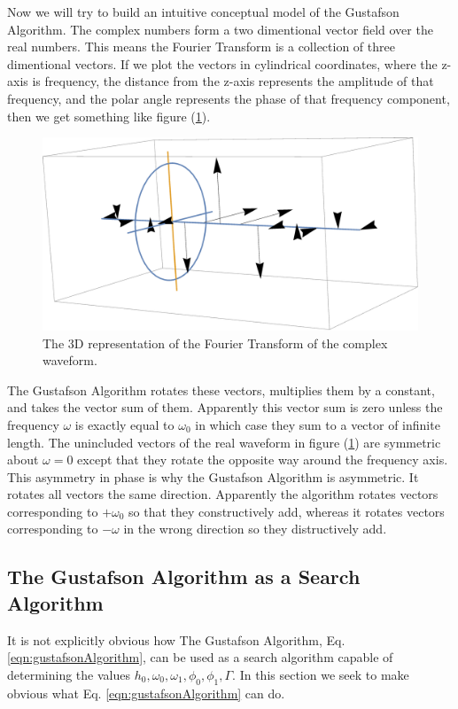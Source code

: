 \documentclass[onecolumn, groupedaddress, 10pt]{revtex4-1}
\begin{document}
Now we will try to build an intuitive conceptual model of the Gustafson Algorithm.  The complex numbers form a two dimentional vector field over the real numbers.  This means the Fourier Transform is a collection of three dimentional vectors.  If we plot the vectors in cylindrical coordinates, where the z-axis is frequency, the distance from the z-axis represents the amplitude of that frequency, and the polar angle represents the phase of that frequency component, then we get something like figure (\ref{fig:3dFourierTransform}).

\begin{figure}[ht]
	\centering
	\includegraphics[width=.75\linewidth]{3dFourierTransform.pdf}
	\caption{\label{fig:3dFourierTransform} The 3D representation of the Fourier Transform of the complex waveform.}
\end{figure}

The Gustafson Algorithm rotates these vectors, multiplies them by a constant, and takes the vector sum of them.  Apparently this vector sum is zero unless the frequency $\omega$ is exactly equal to $\omega_0$ in which case they sum to a vector of infinite length.  The unincluded vectors of the real waveform in figure (\ref{fig:3dFourierTransform}) are symmetric about $\omega=0$ except that they rotate the opposite way around the frequency axis.  This asymmetry in phase is why the Gustafson Algorithm is asymmetric.  It rotates all vectors the same direction.  Apparently the algorithm rotates vectors corresponding to $+\omega_0$ so that they constructively add, whereas it rotates vectors corresponding to $-\omega$ in the wrong direction so they distructively add.


\subsection{The Gustafson Algorithm as a Search Algorithm}
It is not explicitly obvious how The Gustafson Algorithm, Eq. \ref{eqn:gustafsonAlgorithm}, can be used as a search algorithm capable of determining the values $h_0, \omega_0, \omega_1, \phi_0, \phi_1, \Gamma$.  In this section we seek to make obvious what Eq. \ref{eqn:gustafsonAlgorithm} can do. 
\end{document}
